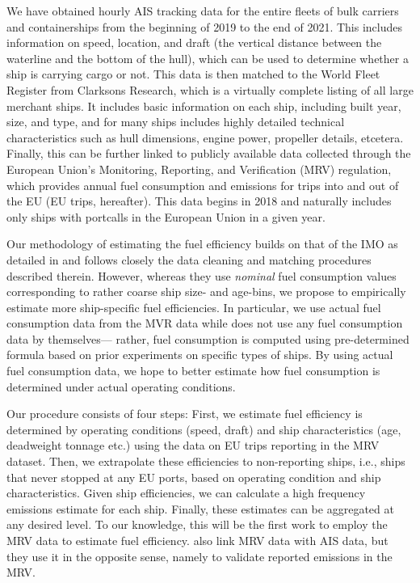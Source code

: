 \documentclass[hidelinks, 12pt,letterpaper]{article}
\begin{document}
We have obtained hourly AIS tracking data for the entire fleets of bulk carriers and containerships from the beginning of 2019 to the end of 2021. This includes information on speed, location, and draft (the vertical distance between the waterline and the bottom of the hull), which can be used to determine whether a ship is carrying cargo or not. This data is then matched to the World Fleet Register from Clarksons Research, which is a virtually complete listing of all large merchant ships. It includes basic  information on each ship, including built year, size, and type, and for many ships includes highly detailed technical characteristics such as hull dimensions, engine power, propeller details, etcetera. Finally, this can be further linked to publicly available data collected through the European Union's Monitoring, Reporting, and Verification (MRV) regulation, which provides annual fuel consumption and emissions for trips into and out of the EU (EU trips, hereafter). This data begins in 2018 and naturally includes only ships with portcalls in the European Union in a given year.

Our methodology of estimating the fuel efficiency builds on that of the IMO as detailed in \citet{faber2020fourth} and follows closely the data cleaning and matching procedures described therein. However, whereas they use \textit{nominal} fuel consumption values corresponding to rather coarse ship size- and age-bins, we propose to empirically estimate more ship-specific fuel efficiencies. In particular, we use actual fuel consumption data  from the MVR data while  \citet{faber2020fourth} does not use any fuel consumption data  by themselves--- rather, fuel consumption is computed using pre-determined formula based on prior experiments on specific types of ships. By using actual fuel consumption data, we hope to better estimate how fuel consumption is determined under actual operating conditions. 


Our procedure consists of four steps: First, we estimate fuel efficiency is determined by operating conditions (speed, draft) and ship characteristics (age, deadweight tonnage etc.) using the data on EU trips reporting in the MRV dataset. 
Then, we extrapolate these efficiencies to non-reporting ships, i.e., ships that never stopped at any EU ports, based on operating condition and ship characteristics. Given ship efficiencies, we can calculate a high frequency emissions estimate for each ship. Finally, these estimates can be aggregated at any desired level. To our knowledge, this will be the first work to employ the MRV data to estimate fuel efficiency. \citet{uge2020estimation} also link MRV data with AIS data, but they use it in the opposite sense, namely to validate reported emissions in the MRV.
\end{document}
